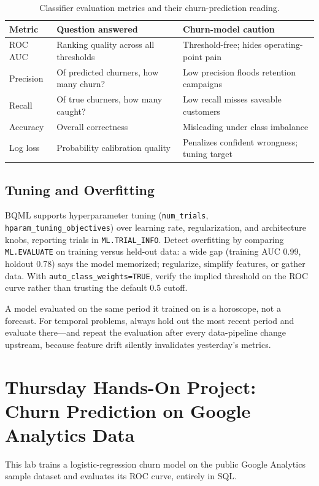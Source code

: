 \begin{table}[H]
\centering
\small
\begin{tabular}{@{}p{3.4cm}p{4.6cm}p{4.6cm}@{}} \\
\toprule
\textbf{Metric} & \textbf{Question answered} & \textbf{Churn-model caution} \\
\midrule
ROC AUC & Ranking quality across all thresholds & Threshold-free; hides operating-point pain \\
Precision & Of predicted churners, how many churn? & Low precision floods retention campaigns \\
Recall & Of true churners, how many caught? & Low recall misses saveable customers \\
Accuracy & Overall correctness & Misleading under class imbalance \\
Log loss & Probability calibration quality & Penalizes confident wrongness; tuning target \\
\bottomrule
\end{tabular}
\caption{Classifier evaluation metrics and their churn-prediction reading.}
\label{tab:ch17-eval-metrics}
\end{table}

\subsection{Tuning and Overfitting}
BQML supports hyperparameter tuning (\texttt{num\_trials}, \texttt{hparam\_tuning\_objectives}) over learning rate, regularization, and architecture knobs, reporting trials in \texttt{ML.TRIAL\_INFO}. Detect overfitting by comparing \texttt{ML.EVALUATE} on training versus held-out data: a wide gap (training AUC 0.99, holdout 0.78) says the model memorized; regularize, simplify features, or gather data. With \texttt{auto\_class\_weights=TRUE}, verify the implied threshold on the ROC curve rather than trusting the default 0.5 cutoff.

\begin{pitfall}
A model evaluated on the same period it trained on is a horoscope, not a forecast. For temporal problems, always hold out the most recent period and evaluate there---and repeat the evaluation after every data-pipeline change upstream, because feature drift silently invalidates yesterday's metrics.
\end{pitfall}

\section{Thursday Hands-On Project: Churn Prediction on Google Analytics Data}
This lab trains a logistic-regression churn model on the public Google Analytics sample dataset and evaluates its ROC curve, entirely in SQL.


